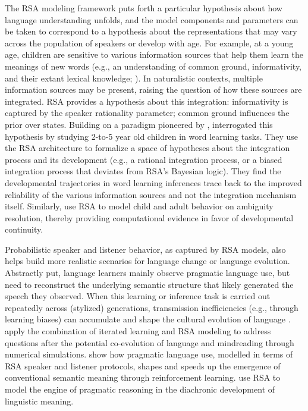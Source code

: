 \documentclass{sp}
\begin{document}
The RSA modeling framework puts forth a particular hypothesis about how language understanding unfolds, and the model components and parameters can be taken to correspond to a hypothesis about the representations that may vary across the population of speakers or develop with age. 
For example, at a young age, children are sensitive to various information sources that help them learn the meanings of new words (e.g., an understanding of common ground, informativity, and their extant lexical knowledge; \citealp{markman1988children, schulze2013, akhtar1996role}).
In naturalistic contexts, multiple information sources may be present, raising the question of how these sources are integrated.
RSA provides a hypothesis about this integration: informativity is captured by the speaker rationality parameter; common ground influences the prior over states.
Building on a paradigm pioneered by \cite{frank2014inferring},
\cite{bohn2019integrating, bohn2019predicting} interrogated this hypothesis by studying 2-to-5 year old children in word learning tasks. 
They use the RSA architecture to formalize a space of hypotheses about the integration process and its development (e.g., a rational integration process, or a biased integration process that deviates from RSA's Bayesian logic).
They find the developmental trajectories in word learning inferences trace back to the improved reliability of the various information sources and not the integration mechanism itself.
Similarly, \cite{savinellietal2017,savinellietal2018} use RSA to model child and adult behavior on ambiguity resolution, thereby providing computational evidence in favor of developmental continuity.

Probabilistic speaker and listener behavior, as captured by RSA models, also helps build more realistic scenarios for language change or language evolution.
Abstractly put, language learners mainly observe pragmatic language use, but need to reconstruct the underlying semantic structure that likely generated the speech they observed.
When this learning or inference task is carried out repeatedly across (stylized) generations, transmission inefficiencies (e.g., through learning biases) can accumulate and shape the cultural evolution of language \citep[e.g.][]{BrochhagenFranke2017:Co-evolution-of,CarcassiSchwoustra2019:The-evolution-o,Carcassi2020:The-cultural-ev}.
\citet{WoensdregtCummins2020:A-computational} apply the combination of iterated learning and RSA modeling to address questions after the potential co-evolution of language and mindreading through numerical simulations.
\citet{OhmerKonig2020:Reinforcement-o} show how pragmatic language use, modelled in terms of RSA speaker and listener protocols, shapes and speeds up the emergence of conventional semantic meaning through reinforcement learning.
\cite{lundetal2019} use RSA to model the engine of pragmatic reasoning in the diachronic development of linguistic meaning.
\end{document}
